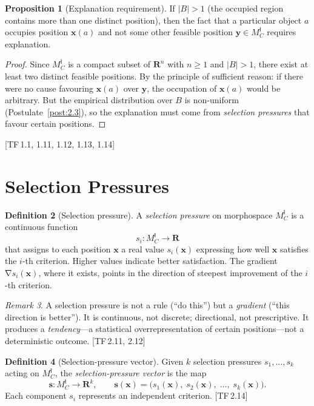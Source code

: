 \documentclass[10pt]{article}
\theoremstyle{definition}
\newtheorem{definition}{Definition}[section]
\newtheorem{proposition}[definition]{Proposition}
\theoremstyle{plain}
\theoremstyle{remark}
\newtheorem{remark}[definition]{Remark}
\newcommand{\MC}{M^{\mathsf{I}}_C}          %
\providecommand{\Rn}{}
\renewcommand{\Rn}{\mathbf{R}^n}            %
\providecommand{\R}{}
\renewcommand{\R}{\mathbf{R}}               %
\newcommand{\abs}[1]{\lvert #1 \rvert}
\DeclareMathOperator{\grad}{\nabla}
\newcommand{\TF}[1]{\textnormal{[TF\,#1]}}  %
\begin{document}
\begin{proposition}[Explanation requirement]\label{prop:1.4}
If $\abs{B} > 1$ (the occupied region contains more than one distinct
position), then the fact that a particular object $a$ occupies position
$\bm{x}(a)$ and not some other feasible position $\bm{y} \in \MC$
requires explanation.

\begin{proof}
Since $\MC$ is a compact subset of $\Rn$ with $n \geq 1$ and $\abs{B} > 1$,
there exist at least two distinct feasible positions. By the principle of
sufficient reason: if there were no cause favouring $\bm{x}(a)$
over $\bm{y}$, the occupation of $\bm{x}(a)$ would be arbitrary.
But the empirical distribution over $B$ is non-uniform
(Postulate~\ref{post:2.3}), so the explanation must come from
\emph{selection pressures} that favour certain positions. \qedhere
\end{proof}
\end{proposition}

\TF{1.1, 1.11, 1.12, 1.13, 1.14}

\newpage
\section{Selection Pressures}\label{sec:pressures}

\begin{definition}[Selection pressure]\label{def:2.1}
A \emph{selection pressure} on morphospace $\MC$ is a continuous
function
\[
  s_i : \MC \longrightarrow \R
\]
that assigns to each position $\bm{x}$ a real value $s_i(\bm{x})$
expressing how well $\bm{x}$ satisfies the $i$-th criterion.
Higher values indicate better satisfaction. The gradient
$\grad s_i(\bm{x})$, where it exists, points in the direction of
steepest improvement of the $i$-th criterion.
\end{definition}

\begin{remark}
A selection pressure is not a rule (``do this'') but a \emph{gradient}
(``this direction is better''). It is continuous, not discrete;
directional, not prescriptive. It produces a \emph{tendency}---a
statistical overrepresentation of certain positions---not a deterministic
outcome. \TF{2.11, 2.12}
\end{remark}

\begin{definition}[Selection-pressure vector]\label{def:2.2}
Given $k$ selection pressures $s_1, \ldots, s_k$ acting on $\MC$,
the \emph{selection-pressure vector} is the map
\[
  \bm{s} : \MC \longrightarrow \R^k, \qquad
  \bm{s}(\bm{x}) = \bigl(s_1(\bm{x}),\; s_2(\bm{x}),\; \ldots,\;
  s_k(\bm{x})\bigr).
\]
Each component $s_i$ represents an independent criterion. \TF{2.14}
\end{definition}
\end{document}
